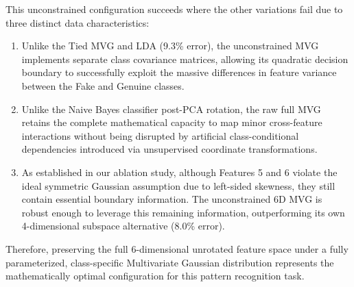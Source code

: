 This unconstrained configuration succeeds where the other variations fail due to three distinct data characteristics:
\begin{enumerate}
    \item Unlike the Tied MVG and LDA (9.3\% error), the unconstrained MVG implements separate class covariance matrices, allowing its quadratic decision boundary to successfully exploit the massive differences in feature variance between the Fake and Genuine classes.
    \item Unlike the Naive Bayes classifier post-PCA rotation, the raw full MVG retains the complete mathematical capacity to map minor cross-feature interactions without being disrupted by artificial class-conditional dependencies introduced via unsupervised coordinate transformations.
    \item As established in our ablation study, although Features 5 and 6 violate the ideal symmetric Gaussian assumption due to left-sided skewness, they still contain essential boundary information. The unconstrained 6D MVG is robust enough to leverage this remaining information, outperforming its own 4-dimensional subspace alternative (8.0\% error).
\end{enumerate}
Therefore, preserving the full 6-dimensional unrotated feature space under a fully parameterized, class-specific Multivariate Gaussian distribution represents the mathematically optimal configuration for this pattern recognition task.
